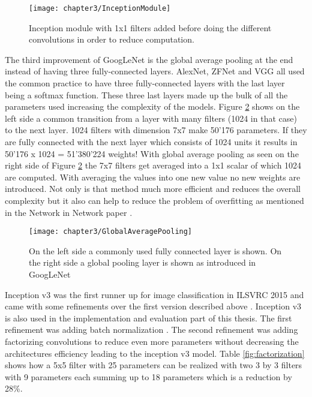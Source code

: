 \begin{figure}[H]
  \centering
  \caption{Inception module with 1x1 filters added before doing the different convolutions in order to reduce computation. \cite{ReviewGoogleLeNetv1}}
  \texttt{[image: chapter3/InceptionModule]}
  \label{fig:InceptionModule}
\end{figure}

The third improvement of GoogLeNet is the global average pooling at the end instead of having three fully-connected layers. AlexNet, ZFNet and VGG all used the common practice to have three fully-connected layers with the last layer being a softmax function. These three last layers made up the bulk of all the parameters used increasing the complexity of the models. Figure \ref{fig:GlobalAveragePooling} shows on the left side a common transition from a layer with many filters (1024 in that case) to the next layer. 1024 filters with dimension 7x7 make 50'176 parameters. If they are fully connected with the next layer which consists of 1024 units it results in 50'176 x 1024 = 51'380'224 weights! With global average pooling as seen on the right side of Figure \ref{fig:GlobalAveragePooling} the 7x7 filters get averaged into a 1x1 scalar of which 1024 are computed. With averaging the values into one new value no new weights are introduced. Not only is that method much more efficient and reduces the overall complexity but it also can help to reduce the problem of overfitting as mentioned in the Network in Network paper \cite{lin2013network}.\\


\begin{figure}[H]
  \centering
  \caption{On the left side a commonly used fully connected layer is shown. On the right side a global pooling layer is shown as introduced in GoogLeNet \cite{ReviewGoogleLeNetv1}}
  \texttt{[image: chapter3/GlobalAveragePooling]}
  \label{fig:GlobalAveragePooling}
\end{figure}

Inception v3 was the first runner up for image classification in ILSVRC 2015 and came with some refinements over the first version described above \cite{szegedy2016rethinking}. Inception v3 is also used in the implementation and evaluation part of this thesis. The first refinement was adding batch normalization \cite{ioffe2015batch}. The second refinement was adding factorizing convolutions to reduce even more parameters without decreasing the architectures efficiency leading to the inception v3 model. Table \ref{fig:factorization} shows how a 5x5 filter with 25 parameters can be realized with two 3 by 3 filters with 9 parameters each summing up to 18 parameters which is a reduction by 28\%. \\


